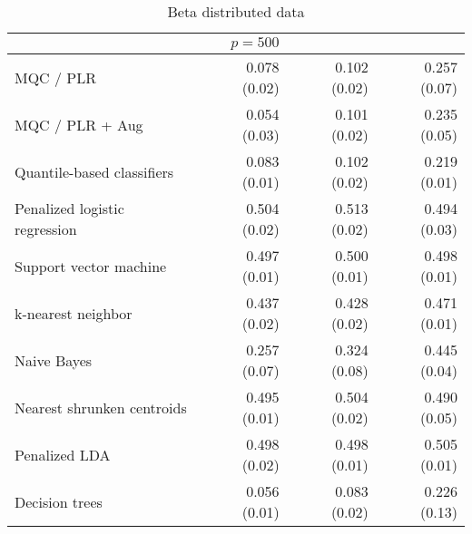 \begin{table}[p]
\begin{adjustbox}{max size={\textwidth}{10cm}}
\begin{tabular}{l@{\extracolsep{15mm}}rrr}
      \hline
      & $p = 500$ \\
      \hline

      MQC / PLR & 0.078 (0.02) & 0.102 (0.02) & 0.257 (0.07) \\ 
      MQC / PLR + Aug & 0.054 (0.03) & 0.101 (0.02) & 0.235 (0.05) \\ 
      Quantile-based classifiers & 0.083 (0.01) & 0.102 (0.02) & 0.219 (0.01) \\ 
      Penalized logistic regression & 0.504 (0.02) & 0.513 (0.02) & 0.494 (0.03) \\ 
      Support vector machine & 0.497 (0.01) & 0.500 (0.01) & 0.498 (0.01) \\ 
      k-nearest neighbor & 0.437 (0.02) & 0.428 (0.02) & 0.471 (0.01) \\ 
      Naive Bayes & 0.257 (0.07) & 0.324 (0.08) & 0.445 (0.04) \\ 
      Nearest shrunken centroids & 0.495 (0.01) & 0.504 (0.02) & 0.490 (0.05) \\ 
      Penalized LDA & 0.498 (0.02) & 0.498 (0.01) & 0.505 (0.01) \\ 
      Decision trees & 0.056 (0.01) & 0.083 (0.02) & 0.226 (0.13) \\ 
      \hline
      
    \end{tabular}
  \end{adjustbox}
  \caption{Beta distributed data}
\end{table}


